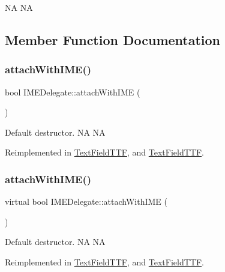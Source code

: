 NA  NA 

\subsection{Member Function Documentation}
\mbox{\label{classIMEDelegate_a4033a961ddbd552473c82e73beaaf25b}} 
\subsubsection{\texorpdfstring{attach\+With\+I\+M\+E()}{attachWithIME()}\hspace{0.1cm}{\footnotesize\ttfamily [1/2]}}
{\footnotesize\ttfamily bool I\+M\+E\+Delegate\+::attach\+With\+I\+ME (\begin{DoxyParamCaption}{ }\end{DoxyParamCaption})\hspace{0.3cm}{\ttfamily [virtual]}}

Default destructor.  NA  NA 

Reimplemented in \hyperlink{classTextFieldTTF_a82bdc3defaeb8bfb1607801954a6baf8}{Text\+Field\+T\+TF}, and \hyperlink{classTextFieldTTF_a51a6ce33247f93c07676dfe1a4e3dbe9}{Text\+Field\+T\+TF}.

\mbox{\label{classIMEDelegate_a081e3be4da413847937dd95b2d52dd57}} 
\subsubsection{\texorpdfstring{attach\+With\+I\+M\+E()}{attachWithIME()}\hspace{0.1cm}{\footnotesize\ttfamily [2/2]}}
{\footnotesize\ttfamily virtual bool I\+M\+E\+Delegate\+::attach\+With\+I\+ME (\begin{DoxyParamCaption}{ }\end{DoxyParamCaption})\hspace{0.3cm}{\ttfamily [virtual]}}

Default destructor.  NA  NA 

Reimplemented in \hyperlink{classTextFieldTTF_a82bdc3defaeb8bfb1607801954a6baf8}{Text\+Field\+T\+TF}, and \hyperlink{classTextFieldTTF_a51a6ce33247f93c07676dfe1a4e3dbe9}{Text\+Field\+T\+TF}.

